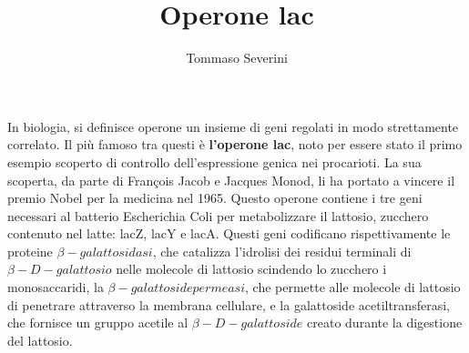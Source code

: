 \documentclass[10pt,a4paper]{article}
\author{Tommaso Severini}
\title{Operone lac}
\begin{document}
	\maketitle
	
	In biologia, si definisce operone un insieme di geni regolati in modo strettamente correlato. Il più famoso tra questi è \textbf{l'operone lac}, noto per essere stato il primo esempio scoperto di controllo dell'espressione genica nei procarioti. La sua scoperta, da parte di  François Jacob e Jacques Monod, li ha portato a vincere il premio Nobel per la medicina nel 1965. Questo operone contiene i tre geni necessari al batterio Escherichia Coli per metabolizzare il lattosio, zucchero contenuto nel latte: lacZ, lacY e lacA. Questi geni codificano rispettivamente le proteine $\beta-galattosidasi$, che catalizza l'idrolisi dei residui terminali di $\beta-D-galattosio$ nelle molecole di lattosio scindendo lo zucchero i monosaccaridi, la $\beta-galattoside permeasi$, che permette alle molecole di lattosio di penetrare attraverso la membrana cellulare, e la galattoside acetiltransferasi, che fornisce un gruppo acetile al $\beta-D-galattoside$ creato durante la digestione del lattosio.
\end{document}
